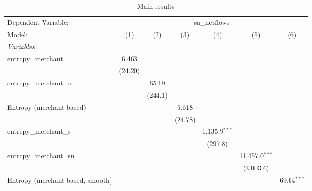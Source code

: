 
\begin{table}[htbp]
   \centering
   \caption{\label{tab:reg_sa_netflows_merchant.tex} Main results}
   \begin{footnotesize}
      \begin{tabular}{lcccccc}
         \tabularnewline\midrule\midrule
         Dependent Variable: & \multicolumn{6}{c}{sa\_netflows}\\
         Model:                           & (1)            & (2)            & (3)            & (4)             & (5)              & (6)\\
         \midrule \emph{Variables} &   &   &   &   &   &  \\
         entropy\_merchant               & 6.463          &                &                &                 &                  &   \\
                                          & (24.20)        &                &                &                 &                  &   \\
         entropy\_merchant\_n           &                & 65.19          &                &                 &                  &   \\
                                          &                & (244.1)        &                &                 &                  &   \\
         Entropy (merchant-based)         &                &                & 6.618          &                 &                  &   \\
                                          &                &                & (24.78)        &                 &                  &   \\
         entropy\_merchant\_s           &                &                &                & 1,135.9$^{***}$ &                  &   \\
                                          &                &                &                & (297.8)         &                  &   \\
         entropy\_merchant\_sn          &                &                &                &                 & 11,457.0$^{***}$ &   \\
                                          &                &                &                &                 & (3,003.6)        &   \\
         Entropy (merchant-based, smooth) &                &                &                &                 &                  & 69.64$^{***}$\\

\end{tabular}
\end{footnotesize}
\end{table}
